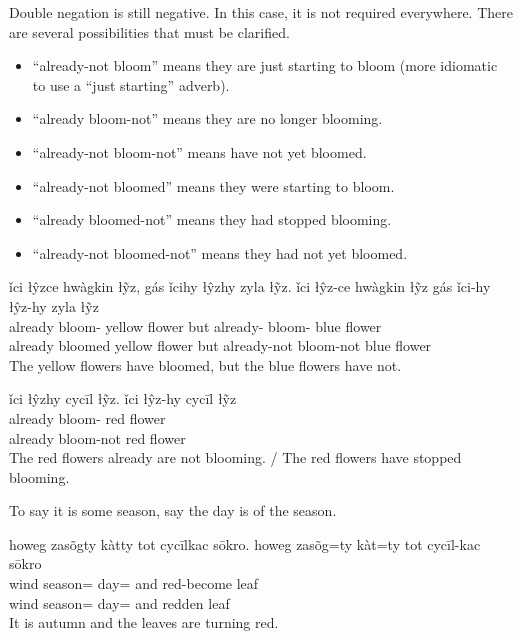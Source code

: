 \documentclass[12pt]{article}
\begin{document}
    Double negation is still negative.
    In this case, it is not required everywhere.
    There are several possibilities that must be clarified.
    \begin{itemize}
        \item ``already-not bloom'' means they are just starting to bloom
        (more idiomatic to use a ``just starting'' adverb).
        \item ``already bloom-not'' means they are no longer blooming.
        \item ``already-not bloom-not'' means have not yet bloomed.
        \item ``already-not bloomed'' means they were starting to bloom.
        \item ``already bloomed-not'' means they had stopped blooming.
        \item ``already-not bloomed-not'' means they had not yet bloomed.
    \end{itemize}
    \begin{exe}
        \ex
        ǐci łŷzce hwàgkin łỹz, gás ǐcihy łŷzhy zyla łỹz.
        \glll
        ǐci łŷz-ce hwàgkin łỹz gás ǐci-hy łŷz-hy zyla łỹz \\
        already bloom-\Pst{} yellow flower but already-\Neg{} bloom-\Neg{} blue flower \\
        already bloomed yellow flower but already-not bloom-not blue flower \\
        \glt
        The yellow flowers have bloomed, but the blue flowers have not.
    \end{exe}

    \begin{exe}
        \ex
        ǐci łŷzhy cycīl łỹz.
        \glll
        ǐci łŷz-hy cycīl łỹz \\
        already bloom-\Neg{} red flower \\
        already bloom-not red flower \\
        \glt
        The red flowers already are not blooming.
        /
        The red flowers have stopped blooming.
    \end{exe}

    To say it is some season, say the day is of the season.
    \begin{exe}
        \ex
        howeg zasõgty kàtty tot cycīlkac sōkro.
        \glll
        howeg zasõg=ty kàt=ty tot cycīl-kac sōkro \\
        wind season=\Poss{} day=\Poss{} and red-become leaf \\
        wind season=\Poss{} day=\Poss{} and redden leaf \\
        \glt
        It is autumn and the leaves are turning red.
    \end{exe}
\end{document}
